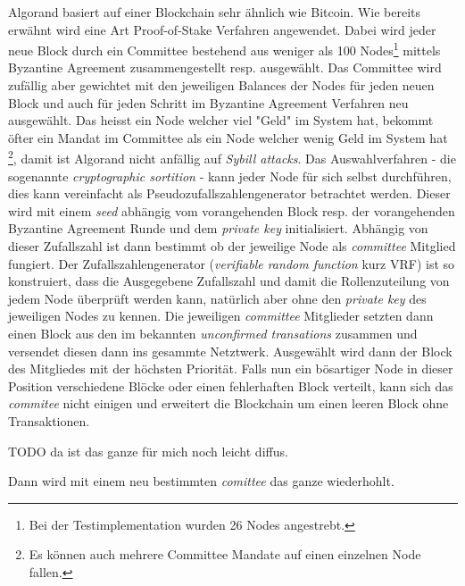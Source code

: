 \documentclass[11pt,a4paper]{article}
\begin{document}
Algorand basiert auf einer Blockchain sehr \"ahnlich wie Bitcoin.
Wie bereits erw\"ahnt wird eine Art Proof-of-Stake Verfahren angewendet.
Dabei wird jeder neue Block durch ein Committee bestehend aus weniger als 100 Nodes\footnote{Bei der Testimplementation wurden 26 Nodes angestrebt.} mittels Byzantine Agreement zusammengestellt resp. ausgewählt.
Das Committee wird zufällig aber gewichtet mit den jeweiligen Balances der Nodes für jeden neuen Block und auch für jeden Schritt im Byzantine Agreement Verfahren neu ausgew\"ahlt.
Das heisst ein Node welcher viel "Geld" im System hat, bekommt \"ofter ein Mandat im Committee als ein Node welcher wenig Geld im System hat \footnote{Es k\"onnen auch mehrere Committee Mandate auf einen einzelnen Node fallen.}, damit ist Algorand nicht anf\"allig auf \textit{Sybill attacks}.
Das Auswahlverfahren - die sogenannte \textit{cryptographic sortition} - kann jeder Node für sich selbst durchführen, dies kann vereinfacht als Pseudozufallszahlengenerator betrachtet werden.
Dieser wird mit einem \textit{seed} abhängig vom vorangehenden Block resp. der vorangehenden Byzantine Agreement Runde und dem \textit{private key} initialisiert.
Abh\"angig von dieser Zufallszahl ist dann bestimmt ob der jeweilige Node als \textit{committee} Mitglied fungiert.
Der Zufallszahlengenerator (\textit{verifiable random function} kurz VRF) ist so konstruiert,
dass die Ausgegebene Zufallszahl und damit die Rollenzuteilung von jedem Node \"uberpr\"uft werden kann,
nat\"urlich aber ohne den \textit{private key} des jeweiligen Nodes zu kennen.
Die jeweiligen \textit{committee} Mitglieder setzten dann einen Block aus den im bekannten \textit{unconfirmed transations} zusammen und versendet diesen dann ins gesammte Netztwerk.
Ausgewählt wird dann der Block des Mitgliedes mit der höchsten Priorität.
Falls nun ein b\"osartiger Node in dieser Position verschiedene Bl\"ocke oder einen fehlerhaften Block
verteilt, kann sich das \textit{commitee} nicht einigen und erweitert die Blockchain um einen leeren Block ohne Transaktionen.

TODO da ist das ganze für mich noch leicht diffus.

Dann wird mit einem neu bestimmten \textit{comittee} das ganze wiederhohlt.

\newpage
\end{document}
